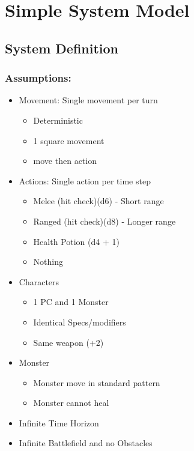 \documentclass[9pt, onecolumn]{report}
\begin{document}

\chapter{Simple System Model}
\section{System Definition}
\subsection{Assumptions:}
\begin{itemize}
    \item Movement: Single movement per turn
    \begin{itemize}
        \item Deterministic
        \item 1 square movement
        \item move then action
    \end{itemize}
    \item Actions: Single action per time step
    \begin{itemize}
        \item Melee (hit check)(d6) - Short range
        \item Ranged (hit check)(d8) - Longer range
        \item Health Potion (d4 + 1)
        \item Nothing
    \end{itemize}
    \item Characters
    \begin{itemize}
        \item 1 PC and 1 Monster
        \item Identical Specs/modifiers
        \item Same weapon (+2)
    \end{itemize}
    \item Monster
    \begin{itemize}
        \item Monster move in standard pattern
        \item Monster cannot heal
    \end{itemize}
    \item Infinite Time Horizon
    \item Infinite Battlefield and no Obstacles
\end{itemize}
\end{document}
